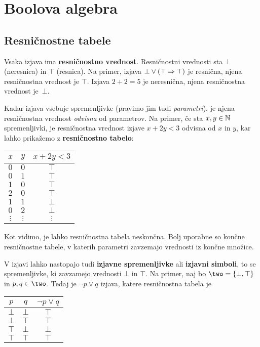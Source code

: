 \chapter{Boolova algebra}

\section{Resničnostne tabele}

Vsaka izjava ima \textbf{resničnostno vrednost}. Resničnostni vrednosti sta $\bot$
(neresnica) in $\top$ (resnica). Na primer, izjava $\bot \lor (\top \Rightarrow \top)$ je resnična, njena resničnostna vrednost je $\top$. Izjava $2 + 2 = 5$ je neresnična, njena resničnostna vrednost je~$\bot$.

Kadar izjava vsebuje spremenljivke (pravimo jim tudi \emph{parametri}), je njena
resničnostna vrednost \emph{odvisna} od parametrov. Na primer, če sta $x, y \in \mathbb{N}$ spremenljivki, je resničnostna vrednost izjave $x + 2 y < 3$ odvisna
od $x$ in $y$, kar lahko prikažemo z \textbf{resničnostno tabelo}:
%
\begin{center}
  \begin{tabular}{ccc}
    \toprule
    $x$ & $y$ & $x + 2 y < 3$ \\ \midrule
    $0$ & $0$ & $\top$ \\
    $0$ & $1$ & $\top$ \\
    $1$ & $0$ & $\top$ \\
    $2$ & $0$ & $\top$ \\
    $1$ & $1$ & $\bot$ \\
    $0$ & $2$ & $\bot$ \\
    $\vdots$ & $\vdots$ & $\vdots$ \\
    \bottomrule
  \end{tabular}
\end{center}
% 
Kot vidimo, je lahko resničnostna tabela neskončna. Bolj uporabne so končne resničnostne tabele, v katerih parametri zavzemajo vrednosti iz končne množice.

V izjavi lahko nastopajo tudi \textbf{izjavne spremenljivke} ali \textbf{izjavni simboli}, to se spremenljivke, ki zavzamejo vrednosti $\bot$ in $\top$.
Na primer, naj bo $\two = \set{\bot, \top}$ in $p, q \in \two$. Tedaj je $\neg p \lor q$ izjava, katere resničnostna tabela je
%
\begin{center}
  \begin{tabular}{ccc}
    \toprule
    $p$ & $q$ & $\neg p \lor q$ \\ \midrule
    $\bot$ & $\bot$ & $\top$ \\
    $\bot$ & $\top$ & $\top$ \\
    $\top$ & $\bot$ & $\bot$ \\
    $\top$ & $\top$ & $\top$ \\
    \bottomrule
  \end{tabular}
\end{center}

